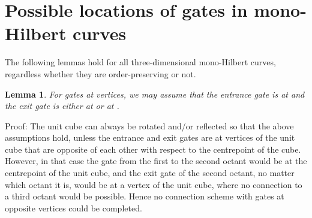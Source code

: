 \documentclass[11pt,a4paper]{article}
\newtheorem{lemma}{Lemma}
\newenvironment{proof}{Proof:}{\qed}
\def\squareforqed{\hbox{\rlap{}}}
\def\qed{\ifmmode\squareforqed\else{\unskip\nobreak\hfil
\penalty50\hskip1em\null\nobreak\hfil\squareforqed
\parfillskip=0pt\finalhyphendemerits=0\endgraf}\fi}
\begin{document}
\break
\appendix

\section{Possible locations of gates in mono-Hilbert curves}

The following lemmas hold for all three-dimensional mono-Hilbert curves, regardless whether they are order-preserving or not.

\begin{lemma}\label{lem:vertex-vertex-gates}
For gates at vertices, we may assume that the entrance gate is at  and the exit gate is either at  or at .
\end{lemma}
\begin{proof}
The unit cube can always be rotated and/or reflected so that the above assumptions hold, unless the entrance and exit gates are at vertices of the unit cube that are opposite of each other with respect to the centrepoint of the cube. However, in that case the gate from the first to the second octant would be at the centrepoint of the unit cube, and the exit gate of the second octant, no matter which octant it is, would be at a vertex of the unit cube, where no connection to a third octant would be possible. Hence no connection scheme with gates at opposite vertices could be completed.
\end{proof}
\end{document}
